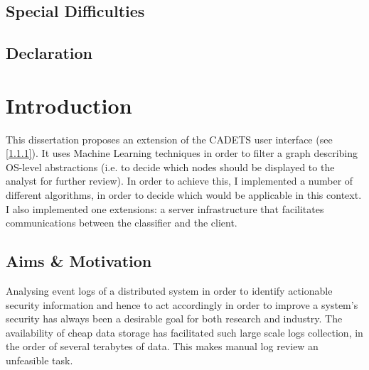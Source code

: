 \documentclass[12pt,a4paper,twoside,openright]{report}
\begin{document}
\section*{Special Difficulties}

\newpage

\section*{Declaration}


\tableofcontents


\listoffigures


\listoftables


\chapter{Introduction}

This dissertation proposes an extension of the CADETS user interface (see \ref{1.1.1}). It uses Machine Learning techniques in order to filter a graph describing OS-level abstractions (i.e. to decide which nodes should be displayed to the analyst for further review). In order to achieve this, I implemented a number of different algorithms, in order to decide which would be applicable in this context. I also implemented one extensions: a server infrastructure that facilitates communications between the classifier and the client.

\section{Aims \& Motivation}  \label{1.1}
Analysing event logs of a distributed system in order to identify actionable security information and hence to act accordingly in order to improve a system's security has always been a desirable goal for both research and industry. The availability of cheap data storage has facilitated such large scale logs collection, in the order of several terabytes of data. This makes manual log review an unfeasible task. 
\end{document}
